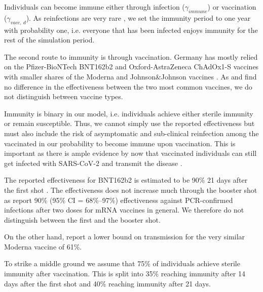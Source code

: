 
Individuals can become immune either through infection ($\gamma_{immune}$) or vaccination
($\gamma_{vacc,\:d}$). As reinfections are very rare \citep{AbuRaddad2020}, we
set the immunity period to one year with probability one, i.e. everyone that has
been infected enjoys immunity for the rest of the simulation period.

The second route to immunity is through vaccination. Germany has mostly relied on the
Pfizer-BioNTech BNT162b2 and Oxford-AstraZeneca ChAdOx1-S vaccines with smaller shares of
the Moderna and Johnson\&Johnson vaccines \citep{Impfdashboard}. As \citet{Pritchard2021}
and \citet{Harris2021} find no difference in the effectiveness between the two most
common vaccines, we do not distinguish between vaccine types.

Immunity is binary in our model, i.e. individuals achieve either sterile immunity or
remain susceptible. Thus, we cannot simply use the reported effectiveness but must also
include the risk of asymptomatic and sub-clinical reinfection among the vaccinated in our
probability to become immune upon vaccination. This is important as there is ample
evidence by now that vaccinated individuals can still get infected with SARS-CoV-2 and
transmit the disease \citep{Petter2021, LevineTiefenbrun2021, Harris2021}.

The reported effectiveness for BNT162b2 is estimated to be 90\% 21 days after the first
shot \citep{Hunter2021}. The effectiveness does not increase much through the booster
shot as \citet{Thompson2021} report 90\% (95\% CI = 68\%–97\%) effectiveness against
PCR-confirmed infections after two doses for mRNA vaccines in general. We therefore do
not distinguish between the first and the booster shot.

On the other hand, \citet{Lipsitch2021} report a lower bound on transmission for
the very similar Moderna vaccine of 61\%.

To strike a middle ground we assume that 75\% of individuals achieve sterile immunity
after vaccination. This is split into 35\% reaching immunity after 14 days after the
first shot and 40\% reaching immunity after 21 days.

\FloatBarrier
